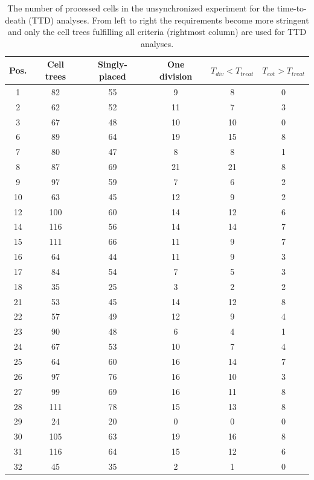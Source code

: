 \documentclass[pdftex,12pt,a4paper]{report}
\begin{document}
\begin{appendices}
\begin{table}[H]
\centering
\begin{tabular}{c | c | c | c | c | c}
\hline
Pos. & Cell trees & Singly-placed & One division & $T_{div} < T_{treat}$ & $T_{eot} > T_{treat}$
\\
\hline\hline
1 & 82 & 55 & 9 & 8 & 0
\\
2 & 62 & 52 & 11 & 7 & 3
\\
3 & 67 & 48 & 10 & 10 & 0
\\
6 & 89 & 64 & 19 & 15 & 8
\\
7 & 80 & 47 & 8 & 8 & 1
\\
8 & 87 & 69 & 21 & 21 & 8
\\
9 & 97 & 59 & 7 & 6 & 2
\\
10 & 63 & 45 & 12 & 9 & 2
\\
12 & 100 & 60 & 14 & 12 & 6
\\
14 & 116 & 56 & 14 & 14 & 7
\\
15 & 111 & 66 & 11 & 9 & 7
\\
16 & 64 & 44 & 11 & 9 & 3
\\
17 & 84 & 54 & 7 & 5 & 3
\\
18 & 35 & 25 & 3 & 2 & 2
\\
21 & 53 & 45 & 14 & 12 & 8
\\
22 & 57 & 49 & 12 & 9 & 4
\\
23 & 90 & 48 & 6 & 4 & 1
\\
24 & 67 & 53 & 10 & 7 & 4
\\
25 & 64 & 60 & 16 & 14 & 7
\\
26 & 97 & 76 & 16 & 10 & 3
\\
27 & 99 & 69 & 16 & 11 & 8
\\
28 & 111 & 78 & 15 & 13 & 8
\\
29 & 24 & 20 & 0 & 0 & 0
\\
30 & 105 & 63 & 19 & 16 & 8
\\
31 & 116 & 64 & 15 & 12 & 6
\\
32 & 45 & 35 & 2 & 1 & 0
\\
\hline
\end{tabular}
\label{table:micro_trench_yields}
\caption[Micro-trench yields statistics for the image positions 1 - 32 in the unsynchronized experiment]{The number of processed cells in the unsynchronized experiment for the time-to-death (TTD) analyses. From left to right the requirements become more stringent and only the cell trees fulfilling all criteria (rightmost column) are used for TTD analyses.}
\end{table}


\end{appendices}
\end{document}
